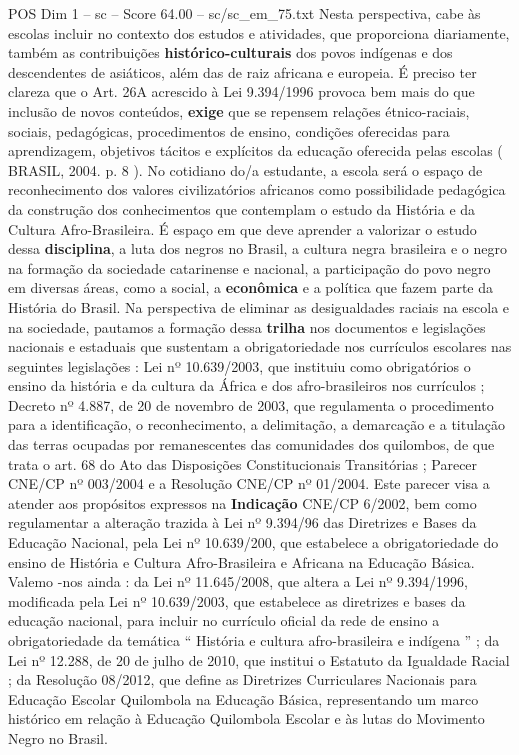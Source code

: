 \begin{textsample}{POS Dim 1 – sc – Score 64.00 – sc/sc\_em\_75.txt}
Nesta perspectiva, cabe às escolas incluir no contexto dos estudos e atividades, que proporciona diariamente, também as contribuições \textbf{histórico-culturais} dos povos indígenas e dos descendentes de asiáticos, além das de raiz africana e europeia.
É preciso ter clareza que o Art. 26A acrescido à Lei 9.394/1996 provoca bem mais do que inclusão de novos conteúdos, \textbf{exige} que se repensem relações étnico-raciais, sociais, pedagógicas, procedimentos de ensino, condições oferecidas para aprendizagem, objetivos tácitos e explícitos da educação oferecida pelas escolas ( BRASIL, 2004. p. 8 ).
No cotidiano do/a estudante, a escola será o espaço de reconhecimento dos valores civilizatórios africanos como possibilidade pedagógica da construção dos conhecimentos que contemplam o estudo da História e da Cultura Afro-Brasileira.
É espaço em que deve aprender a valorizar o estudo dessa \textbf{disciplina}, a luta dos negros no Brasil, a cultura negra brasileira e o negro na formação da sociedade catarinense e nacional, a participação do povo negro em diversas áreas, como a social, a \textbf{econômica} e a política que fazem parte da História do Brasil.
Na perspectiva de eliminar as desigualdades raciais na escola e na sociedade, pautamos a formação dessa \textbf{trilha} nos documentos e legislações nacionais e estaduais que sustentam a obrigatoriedade nos currículos escolares nas seguintes legislações : Lei nº 10.639/2003, que instituiu como obrigatórios o ensino da história e da cultura da África e dos afro-brasileiros nos currículos ; Decreto nº 4.887, de 20 de novembro de 2003, que regulamenta o procedimento para a identificação, o reconhecimento, a delimitação, a demarcação e a titulação das terras ocupadas por remanescentes das comunidades dos quilombos, de que trata o art. 68 do Ato das Disposições Constitucionais Transitórias ; Parecer CNE/CP nº 003/2004 e a Resolução CNE/CP nº 01/2004.
Este parecer visa a atender aos propósitos expressos na \textbf{Indicação} CNE/CP 6/2002, bem como regulamentar a alteração trazida à Lei nº 9.394/96 das Diretrizes e Bases da Educação Nacional, pela Lei nº 10.639/200, que estabelece a obrigatoriedade do ensino de História e Cultura Afro-Brasileira e Africana na Educação Básica.
Valemo -nos ainda : da Lei nº 11.645/2008, que altera a Lei nº 9.394/1996, modificada pela Lei nº 10.639/2003, que estabelece as diretrizes e bases da educação nacional, para incluir no currículo oficial da rede de ensino a obrigatoriedade da temática “ História e cultura afro-brasileira e indígena ” ; da Lei nº 12.288, de 20 de julho de 2010, que institui o Estatuto da Igualdade Racial ; da Resolução 08/2012, que define as Diretrizes Curriculares Nacionais para Educação Escolar Quilombola na Educação Básica, representando um marco histórico em relação à Educação Quilombola Escolar e às lutas do Movimento Negro no Brasil.

\end{textsample}
